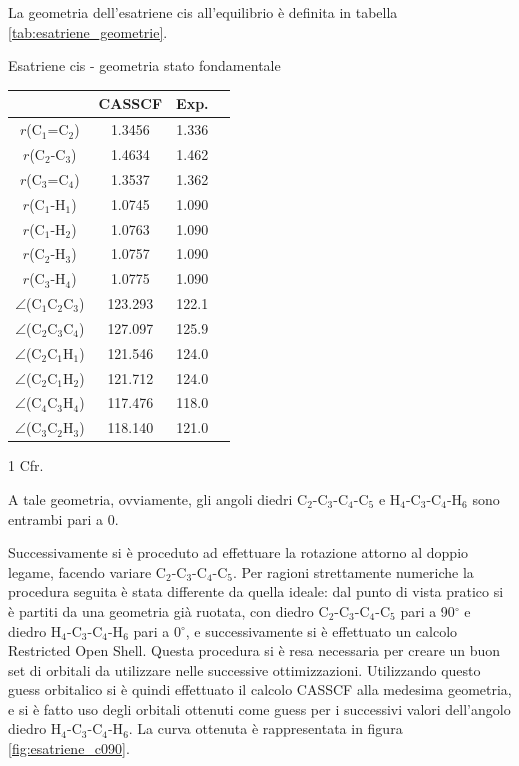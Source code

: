 La geometria dell'esatriene cis all'equilibrio \`e definita in tabella
\ref{tab:esatriene_geometrie}.
\begin{center}
\begin{threeparttable}
\caption{\small Esatriene cis - geometria stato fondamentale}
\label{tab:esatriene_geometrie}
\small
\begin{tabular}{|ccc|c|}
\hline
							& CASSCF	& Exp.\tnote{1} \\ 
\hline
$r$(C$_1$=C$_2$)			& 1.3456	& 1.336				\\
$r$(C$_2$-C$_3$)			& 1.4634	& 1.462				\\
$r$(C$_3$=C$_4$)			& 1.3537	& 1.362				\\
$r$(C$_1$-H$_1$)			& 1.0745	& 1.090				\\
$r$(C$_1$-H$_2$)			& 1.0763	& 1.090				\\
$r$(C$_2$-H$_3$)			& 1.0757	& 1.090				\\
$r$(C$_3$-H$_4$)			& 1.0775	& 1.090				\\
$\angle$(C$_1$C$_2$C$_3$)	& 123.293	& 122.1			 \\
$\angle$(C$_2$C$_3$C$_4$)	& 127.097	& 125.9		 \\
$\angle$(C$_2$C$_1$H$_1$)	& 121.546	& 124.0		 \\
$\angle$(C$_2$C$_1$H$_2$)	& 121.712	& 124.0		 \\
$\angle$(C$_4$C$_3$H$_4$)	& 117.476	& 118.0		 \\
$\angle$(C$_3$C$_2$H$_3$)	& 118.140	& 121.0		 \\
\hline
\end{tabular}
\begin{tablenotes}
\small
 \item[1] Cfr. \cite{jcp-114-4-2001-1631}
\end{tablenotes}
\end{threeparttable}
\end{center}

A tale geometria, ovviamente, gli angoli diedri \mbox{C$_2$-C$_3$-C$_4$-C$_5$} e
\mbox{H$_4$-C$_3$-C$_4$-H$_6$} sono entrambi pari a 0.

Successivamente si \`e proceduto ad effettuare la rotazione attorno al
doppio legame, facendo variare \mbox{C$_2$-C$_3$-C$_4$-C$_5$}. Per ragioni
strettamente numeriche la procedura seguita \`e stata differente da quella
ideale: dal punto di vista pratico si \`e partiti da una geometria gi\`a
ruotata, con diedro \mbox{C$_2$-C$_3$-C$_4$-C$_5$} pari a 90$^{\circ}$ e
diedro \mbox{H$_4$-C$_3$-C$_4$-H$_6$} pari a 0$^{\circ}$, e successivamente
si \`e effettuato un calcolo Restricted Open Shell. Questa procedura si \`e
resa necessaria per creare un buon set di orbitali da utilizzare nelle
successive ottimizzazioni. Utilizzando questo guess orbitalico si \`e quindi
effettuato il calcolo CASSCF alla medesima geometria, e si \`e fatto uso
degli orbitali ottenuti come guess per i successivi valori dell'angolo diedro
\mbox{H$_4$-C$_3$-C$_4$-H$_6$}.  La curva ottenuta \`e rappresentata in
figura \ref{fig:esatriene_c090}.


